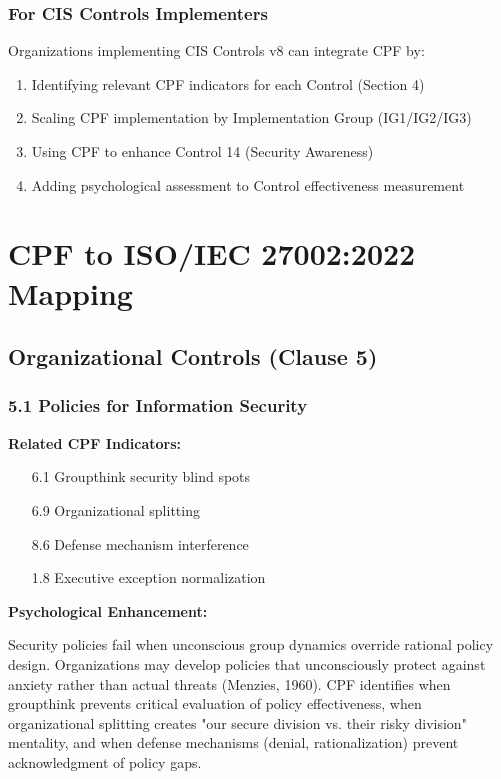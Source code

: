 \documentclass[11pt,a4paper]{article}
\begin{document}
\subsubsection{For CIS Controls Implementers}

Organizations implementing CIS Controls v8 can integrate CPF by:

\begin{enumerate}
\item Identifying relevant CPF indicators for each Control (Section 4)
\item Scaling CPF implementation by Implementation Group (IG1/IG2/IG3)
\item Using CPF to enhance Control 14 (Security Awareness)
\item Adding psychological assessment to Control effectiveness measurement
\end{enumerate}

\section{CPF to ISO/IEC 27002:2022 Mapping}

\subsection{Organizational Controls (Clause 5)}

\subsubsection{5.1 Policies for Information Security}

\textbf{Related CPF Indicators:}
\begin{itemize}
\item [6.1] Groupthink security blind spots
\item [6.9] Organizational splitting
\item [8.6] Defense mechanism interference
\item [1.8] Executive exception normalization
\end{itemize}

\textbf{Psychological Enhancement:}

Security policies fail when unconscious group dynamics override rational policy design. Organizations may develop policies that unconsciously protect against anxiety rather than actual threats (Menzies, 1960). CPF identifies when groupthink prevents critical evaluation of policy effectiveness, when organizational splitting creates "our secure division vs. their risky division" mentality, and when defense mechanisms (denial, rationalization) prevent acknowledgment of policy gaps.
\end{document}
